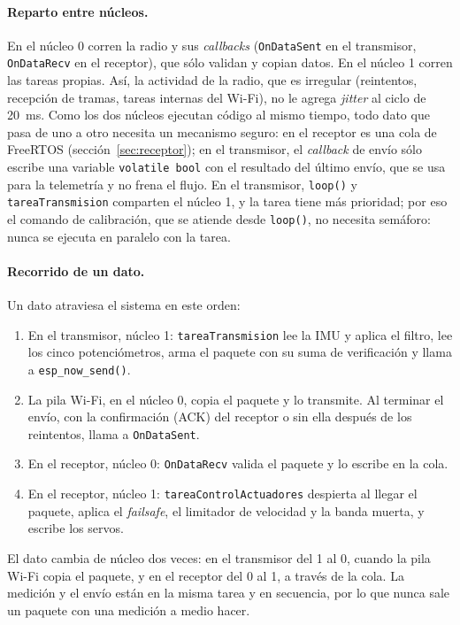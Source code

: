 \paragraph{Reparto entre núcleos.} En el núcleo 0 corren la radio y sus \textit{callbacks} (\texttt{OnDataSent} en el transmisor, \texttt{OnDataRecv} en el receptor), que sólo validan y copian datos. En el núcleo 1 corren las tareas propias. Así, la actividad de la radio, que es irregular (reintentos, recepción de tramas, tareas internas del Wi-Fi), no le agrega \textit{jitter} al ciclo de \SI{20}{\milli\second}. Como los dos núcleos ejecutan código al mismo tiempo, todo dato que pasa de uno a otro necesita un mecanismo seguro: en el receptor es una cola de FreeRTOS (sección~\ref{sec:receptor}); en el transmisor, el \textit{callback} de envío sólo escribe una variable \texttt{volatile bool} con el resultado del último envío, que se usa para la telemetría y no frena el flujo. En el transmisor, \texttt{loop()} y \texttt{tareaTransmision} comparten el núcleo 1, y la tarea tiene más prioridad; por eso el comando de calibración, que se atiende desde \texttt{loop()}, no necesita semáforo: nunca se ejecuta en paralelo con la tarea.

\paragraph{Recorrido de un dato.} Un dato atraviesa el sistema en este orden:
\begin{enumerate}
    \item En el transmisor, núcleo 1: \texttt{tareaTransmision} lee la IMU y aplica el filtro, lee los cinco potenciómetros, arma el paquete con su suma de verificación y llama a \texttt{esp\_now\_send()}.
    \item La pila Wi-Fi, en el núcleo 0, copia el paquete y lo transmite. Al terminar el envío, con la confirmación (ACK) del receptor o sin ella después de los reintentos, llama a \texttt{OnDataSent}.
    \item En el receptor, núcleo 0: \texttt{OnDataRecv} valida el paquete y lo escribe en la cola.
    \item En el receptor, núcleo 1: \texttt{tareaControlActuadores} despierta al llegar el paquete, aplica el \textit{failsafe}, el limitador de velocidad y la banda muerta, y escribe los servos.
\end{enumerate}
El dato cambia de núcleo dos veces: en el transmisor del 1 al 0, cuando la pila Wi-Fi copia el paquete, y en el receptor del 0 al 1, a través de la cola. La medición y el envío están en la misma tarea y en secuencia, por lo que nunca sale un paquete con una medición a medio hacer.


